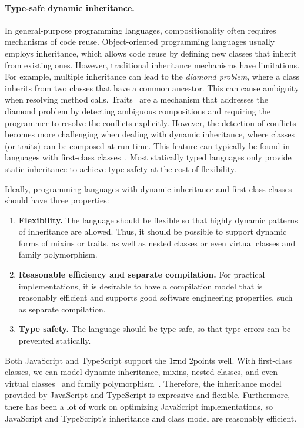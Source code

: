 \paragraph{Type-safe dynamic inheritance.}
In general-purpose programming languages, compositionality often requires
mechanisms of code reuse. Object-oriented programming languages usually employs
inheritance, which allows code reuse by defining new classes that inherit from
existing ones. However, traditional inheritance mechanisms have limitations. For
example, multiple inheritance can lead to the \emph{diamond problem}, where a
class inherits from two classes that have a common ancestor. This can cause
ambiguity when resolving method calls. Traits~\citep{ducasse2006traits} are a
mechanism that addresses the diamond problem by detecting ambiguous compositions
and requiring the programmer to resolve the conflicts explicitly. However, the
detection of conflicts becomes more challenging when dealing with dynamic
inheritance, where classes (or traits) can be composed at run time. This feature
can typically be found in languages with first-class
classes~\citep{takikawa2012gradual,lee2015theory}. Most statically typed
languages only provide static inheritance to achieve type safety at the cost of
flexibility.

Ideally, programming languages with dynamic inheritance and first-class classes
should have three properties:
\begin{enumerate}
\item \textbf{Flexibility.} The language should be flexible so that highly
      dynamic patterns of inheritance are allowed. Thus, it should be possible
      to support dynamic forms of mixins or traits, as well as nested classes or
      even virtual classes and family polymorphism.
\item \textbf{Reasonable efficiency and separate compilation.} For practical
      implementations, it is desirable to have a compilation model that is
      reasonably efficient and supports good software engineering properties,
      such as separate compilation.
\item \textbf{Type safety.} The language should be type-safe, so that type
      errors can be prevented statically.
\end{enumerate}
Both JavaScript and TypeScript support the 1\st and 2\nd points well. With
first-class classes, we can model dynamic inheritance, mixins, nested classes,
and even virtual
classes~\citep{madsen1989virtual,ernst2006virtual,clarke2007tribe} and family
polymorphism~\citep{ernst2001family,saito2008lightweight,zhang2017familia}.
Therefore, the inheritance model provided by JavaScript and TypeScript is
expressive and flexible. Furthermore, there has been a lot of work on optimizing
JavaScript implementations, so JavaScript and TypeScript's inheritance and class
model are reasonably efficient.

